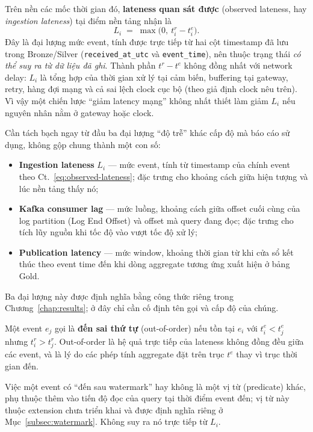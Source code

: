 Trên nền các mốc thời gian đó, \textbf{lateness quan sát được} (observed
lateness, hay \textit{ingestion lateness}) tại điểm nền tảng nhận là
\begin{equation}
  L_i \;=\; \max\bigl(0,\ t^{r}_i - t^{e}_i\bigr).
  \label{eq:observed-lateness}
\end{equation}
Đây là đại lượng mức event, tính được trực tiếp từ hai cột timestamp đã lưu
trong Bronze/Silver (\texttt{received\_at\_utc} và \texttt{event\_time}),
nên thuộc trạng thái \emph{có thể suy ra từ dữ liệu đã ghi}. Thành phần
$t^{r} - t^{e}$ không đồng nhất với network delay: $L_i$ là tổng hợp của
thời gian xử lý tại cảm biến, buffering tại gateway, retry, hàng đợi mạng
và cả sai lệch clock cục bộ (theo giả định clock nêu trên). Vì vậy một
chiến lược ``giảm latency mạng'' không nhất thiết làm giảm $L_i$ nếu nguyên
nhân nằm ở gateway hoặc clock.

Cần tách bạch ngay từ đầu ba đại lượng ``độ trễ'' khác cấp độ mà báo cáo
sử dụng, không gộp chung thành một con số:

\begin{itemize}
  \item \textbf{Ingestion lateness} $L_i$ --- mức event, tính từ timestamp
        của chính event theo Ct.~\ref{eq:observed-lateness}; đặc trưng cho
        khoảng cách giữa hiện tượng và lúc nền tảng thấy nó;
  \item \textbf{Kafka consumer lag} --- mức luồng, khoảng cách giữa offset
        cuối cùng của log partition (Log End Offset) và offset mà query
        đang đọc; đặc trưng cho tích lũy nguồn khi tốc độ vào vượt tốc độ
        xử lý;
  \item \textbf{Publication latency} --- mức window, khoảng thời gian từ
        khi cửa sổ kết thúc theo event time đến khi dòng aggregate tương
        ứng xuất hiện ở bảng Gold.
\end{itemize}
Ba đại lượng này được định nghĩa bằng công thức riêng trong
Chương~\ref{chap:results}; ở đây chỉ cần cố định tên gọi và cấp độ của
chúng.

Một event $e_j$ gọi là \textbf{đến sai thứ tự} (out-of-order) nếu tồn tại
$e_i$ với $t^{e}_i < t^{e}_j$ nhưng $t^{r}_i > t^{r}_j$. Out-of-order là hệ
quả trực tiếp của lateness không đồng đều giữa các event, và là lý do các
phép tính aggregate đặt trên trục $t^{e}$ thay vì trục thời gian đến.

Việc một event có ``đến sau watermark'' hay không là một vị từ (predicate)
khác, phụ thuộc thêm vào tiến độ đọc của query tại thời điểm event đến;
vị từ này thuộc extension chưa triển khai và được định nghĩa riêng ở
Mục~\ref{subsec:watermark}. Không suy ra nó trực tiếp từ $L_i$.

